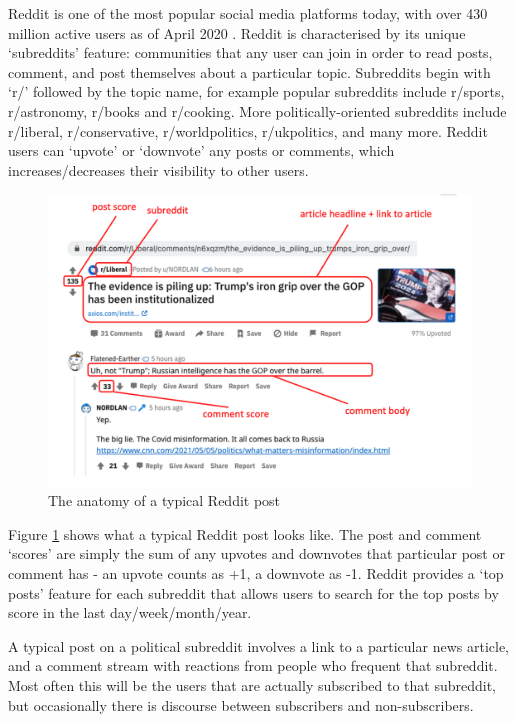 Reddit is one of the most popular social media platforms today, with over 430 million active users as of April 2020 \cite{sattelberg}. Reddit is characterised by its unique `subreddits' feature: communities that any user can join in order to read posts, comment, and post themselves about a particular topic. Subreddits begin with `r/' followed by the topic name, for example popular subreddits include r/sports, r/astronomy, r/books and r/cooking. More politically-oriented subreddits include r/liberal, r/conservative, r/worldpolitics, r/ukpolitics, and many more. Reddit users can `upvote' or `downvote' any posts or comments, which increases/decreases their visibility to other users.

\begin{figure}
    \centering
    \includegraphics[scale=0.27]{0-img/annotated-reddit-post.png}
    \caption{The anatomy of a typical Reddit post}
    \label{fig:annotated-reddit-post}
\end{figure}

Figure \ref{fig:annotated-reddit-post} shows what a typical Reddit post looks like. The post and comment `scores' are simply the sum of any upvotes and downvotes that particular post or comment has - an upvote counts as +1, a downvote as -1. Reddit provides a `top posts' feature for each subreddit that allows users to search for the top posts by score in the last day/week/month/year.

A typical post on a political subreddit involves a link to a particular news article, and a comment stream with reactions from people who frequent that subreddit. Most often this will be the users that are actually subscribed to that subreddit, but occasionally there is discourse between subscribers and non-subscribers.

